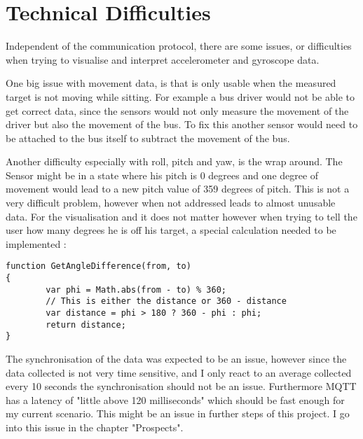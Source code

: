 \section{Technical Difficulties}

Independent of the communication protocol, there are some issues, or difficulties when trying to visualise and interpret accelerometer and gyroscope data.  

One big issue with movement data, is that is only usable when the measured target is not moving while sitting. For example a bus driver would not be able to get correct data, since the sensors would not only measure the movement of the driver but also the movement of the bus. To fix this another sensor would need to be attached to the bus itself to subtract the movement of the bus. 

Another difficulty especially with roll, pitch and yaw, is the wrap around. The Sensor might be in a state where his pitch is 0 degrees and one degree of movement would lead to a new pitch value of 359 degrees of pitch. This is not a very difficult problem, however when not addressed leads to almost unusable data. 
For the visualisation and it does not matter however when trying to tell the user how many degrees he is off his target, a special calculation needed to be implemented \cite{javaHowd16:online}:

\begin{lstlisting}
function GetAngleDifference(from, to)
{
        var phi = Math.abs(from - to) % 360;
        // This is either the distance or 360 - distance
        var distance = phi > 180 ? 360 - phi : phi;
        return distance;
}
\end{lstlisting}

The synchronisation of the data was expected to be an issue, however since the data collected is not very time sensitive, and I only react to an average collected every 10 seconds the synchronisation should not be an issue. Furthermore MQTT has a latency of "little above 120 milliseconds" \cite{Measurin4:online} which should be fast enough for my current scenario. This might be an issue in further steps of this project. I go into this issue in the chapter "Prospects".